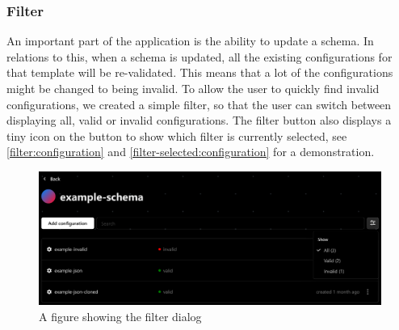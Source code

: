 \subsubsection{Filter}

An important part of the application is the ability to update a schema. In relations to this, when a schema is updated, all the existing configurations for that template will be re-validated. This means that a lot of the  configurations might be changed to being invalid. To allow the user to quickly find invalid configurations, we created a simple filter, so that the user can switch between displaying all, valid or invalid configurations. The filter button also displays a tiny icon on the button to show which filter is currently selected, see \autoref{filter:configuration} and \autoref{filter-selected:configuration} for a demonstration.


\begin{figure}[!ht]
   \begin{minipage}{1\textwidth}
    \centering
    \includegraphics[width=.85\textwidth]{Figures/configurations-page/filter-crop.pdf}
     \caption[Filter dialog]{A figure showing the filter dialog}
     \label{filter:configuration}
   \end{minipage}\hfill
\end{figure}


